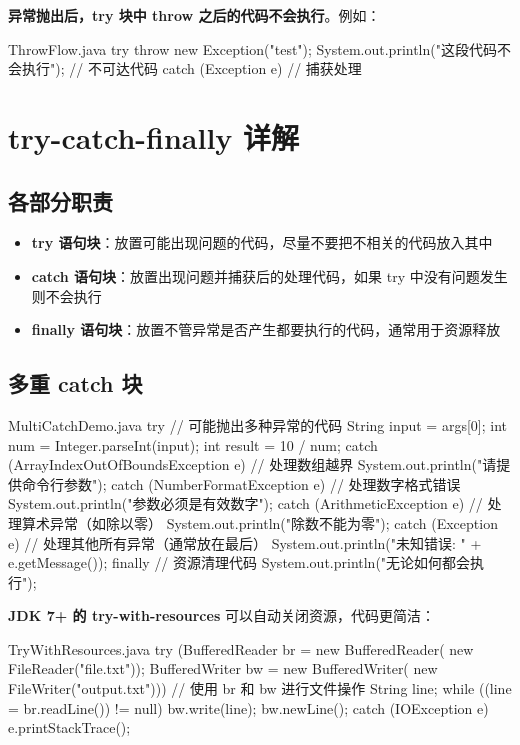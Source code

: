 \begin{warningbox}
\textbf{异常抛出后，try 块中 throw 之后的代码不会执行}。例如：
\begin{codeblock}[Java]{ThrowFlow.java}
try {
    throw new Exception("test");
    System.out.println("这段代码不会执行"); // 不可达代码
} catch (Exception e) {
    // 捕获处理
}
\end{codeblock}
\end{warningbox}

\section{try-catch-finally 详解}

\subsection{各部分职责}

\begin{itemize}
  \item \textbf{try 语句块}：放置可能出现问题的代码，尽量不要把不相关的代码放入其中
  \item \textbf{catch 语句块}：放置出现问题并捕获后的处理代码，如果 try 中没有问题发生则不会执行
  \item \textbf{finally 语句块}：放置不管异常是否产生都要执行的代码，通常用于资源释放
\end{itemize}

\subsection{多重 catch 块}

\begin{codeblock}[Java]{MultiCatchDemo.java}
try {
    // 可能抛出多种异常的代码
    String input = args[0];
    int num = Integer.parseInt(input);
    int result = 10 / num;
} catch (ArrayIndexOutOfBoundsException e) {
    // 处理数组越界
    System.out.println("请提供命令行参数");
} catch (NumberFormatException e) {
    // 处理数字格式错误
    System.out.println("参数必须是有效数字");
} catch (ArithmeticException e) {
    // 处理算术异常（如除以零）
    System.out.println("除数不能为零");
} catch (Exception e) {
    // 处理其他所有异常（通常放在最后）
    System.out.println("未知错误: " + e.getMessage());
} finally {
    // 资源清理代码
    System.out.println("无论如何都会执行");
}
\end{codeblock}

\begin{cautionbox}
\textbf{JDK 7+ 的 try-with-resources} 可以自动关闭资源，代码更简洁：
\begin{codeblock}[Java]{TryWithResources.java}
try (BufferedReader br = new BufferedReader(
        new FileReader("file.txt"));
     BufferedWriter bw = new BufferedWriter(
        new FileWriter("output.txt"))) {
    // 使用 br 和 bw 进行文件操作
    String line;
    while ((line = br.readLine()) != null) {
        bw.write(line);
        bw.newLine();
    }
} catch (IOException e) {
    e.printStackTrace();
}
\end{codeblock}
\end{cautionbox}


